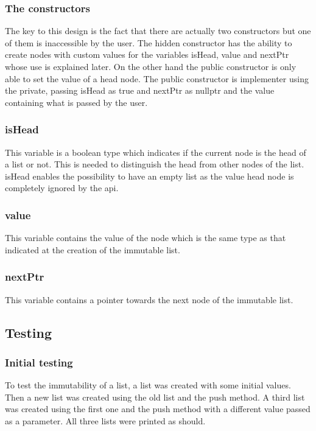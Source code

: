 \documentclass[a4paper, 12pt]{report}
\begin{document}
\subsubsection{The constructors}
The key to this design is the fact that there are actually two constructors but one of them is inaccessible by the user. The hidden constructor has the ability to create nodes with custom values for the variables isHead, value and nextPtr whose use is explained later. On the other hand the public constructor is only able to set the value of a head node. The public constructor is implementer using the private, passing isHead as true and nextPtr as nullptr and the value containing what is passed by the user.

\subsubsection{isHead}
This variable is a boolean type which indicates if the current node is the head of a list or not. This is needed to distinguish the head from other nodes of the list.  isHead enables the possibility to have an empty list as the value head node is completely ignored by the api.

\subsubsection{value}
This variable contains the value of the node which is the same type as that indicated at the creation of the immutable list.

\subsubsection{nextPtr}
This variable contains a pointer towards the next node of the immutable list.

\subsection{Testing}
\subsubsection{Initial testing}
To test the immutability of a list, a list was created with some initial values. Then a new list was created using the old list and the push method. A third list was created using the first one and the push method with a different value passed as a parameter. All three lists were printed as should.
\end{document}
